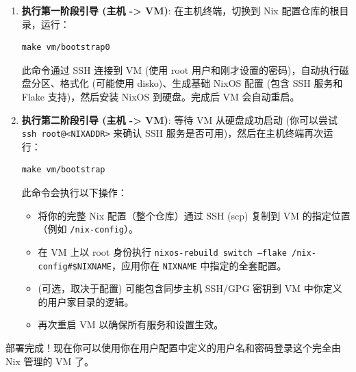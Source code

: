 \documentclass[11pt, a4paper]{article} %
\begin{document}
\begin{enumerate}[label=\textbf{\arabic*.}, wide, labelwidth=!, labelindent=0pt]
\begin{itemize}
        \end{itemize}
    \item \textbf{执行第一阶段引导 (主机 -> VM)}: 在主机终端，切换到 Nix 配置仓库的根目录，运行：
        \begin{lstlisting}
make vm/bootstrap0
        \end{lstlisting}
        此命令通过 SSH 连接到 VM (使用 root 用户和刚才设置的密码)，自动执行磁盘分区、格式化 (可能使用 disko)、生成基础 NixOS 配置 (包含 SSH 服务和 Flake 支持)，然后安装 NixOS 到硬盘。完成后 VM 会自动重启。
    \item \textbf{执行第二阶段引导 (主机 -> VM)}: 等待 VM 从硬盘成功启动 (你可以尝试 \texttt{ssh root@<NIXADDR>} 来确认 SSH 服务是否可用)，然后在主机终端再次运行：
        \begin{lstlisting}
make vm/bootstrap
        \end{lstlisting}
        此命令会执行以下操作：
        \begin{itemize}
            \item 将你的完整 Nix 配置（整个仓库）通过 SSH (scp) 复制到 VM 的指定位置（例如 \texttt{/nix-config}）。
            \item 在 VM 上以 root 身份执行 \texttt{nixos-rebuild switch --flake /nix-config\#\$NIXNAME}，应用你在 \texttt{NIXNAME} 中指定的全套配置。
            \item (可选，取决于配置) 可能包含同步主机 SSH/GPG 密钥到 VM 中你定义的用户家目录的逻辑。
            \item 再次重启 VM 以确保所有服务和设置生效。
        \end{itemize}
\end{enumerate}
部署完成！现在你可以使用你在用户配置中定义的用户名和密码登录这个完全由 Nix 管理的 VM 了。
\end{document}
